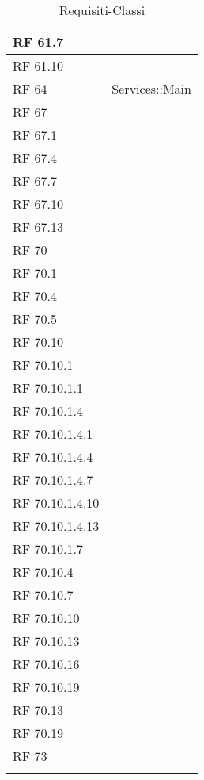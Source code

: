 \begin{center}
\begin{longtable}{ | p{2cm} | p{12cm} | }
 \hline 
RF 61.7 & \\ 
 \hline 
RF 61.10 & \\ 
 \hline 
RF 64 & Services::Main \\ 
 \hline 
RF 67 & \\ 
 \hline 
RF 67.1 & \\ 
 \hline 
RF 67.4 & \\ 
 \hline 
RF 67.7 & \\ 
 \hline 
RF 67.10 & \\ 
 \hline 
RF 67.13 & \\ 
 \hline 
RF 70 & \\ 
 \hline 
RF 70.1 & \\ 
 \hline 
RF 70.4 & \\ 
 \hline 
RF 70.5 & \\ 
 \hline 
RF 70.10 & \\ 
 \hline 
RF 70.10.1 & \\ 
 \hline 
RF 70.10.1.1 & \\ 
 \hline 
RF 70.10.1.4 & \\ 
 \hline 
RF 70.10.1.4.1 & \\ 
 \hline 
RF 70.10.1.4.4 & \\ 
 \hline 
RF 70.10.1.4.7 & \\ 
 \hline 
RF 70.10.1.4.10 & \\ 
 \hline 
RF 70.10.1.4.13 & \\ 
 \hline 
RF 70.10.1.7 & \\ 
 \hline 
RF 70.10.4 & \\ 
 \hline 
RF 70.10.7 & \\ 
 \hline 
RF 70.10.10 & \\ 
 \hline 
RF 70.10.13 & \\ 
 \hline 
RF 70.10.16 & \\ 
 \hline 
RF 70.10.19 & \\ 
 \hline 
RF 70.13 & \\ 
 \hline 
RF 70.19 & \\ 
 \hline 
RF 73 & \\

\caption{Requisiti-Classi}
\end{longtable}
\egroup
\end{center}


